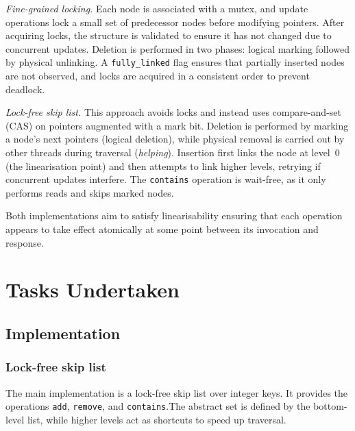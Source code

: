 \documentclass[11pt,a4paper]{article}
\begin{document}
\emph{Fine-grained locking.}
Each node is associated with a mutex, and update operations lock a small set of
predecessor nodes before modifying pointers. After acquiring locks, the
structure is validated to ensure it has not changed due to concurrent updates.
Deletion is performed in two phases: logical marking followed by physical
unlinking. A \texttt{fully\_linked} flag ensures that partially inserted nodes
are not observed, and locks are acquired in a consistent order to prevent
deadlock.

\emph{Lock-free skip list.}
This approach avoids locks and instead uses compare-and-set (CAS) on pointers
augmented with a mark bit. Deletion is performed by marking a node’s next
pointers (logical deletion), while physical removal is carried out by other
threads during traversal (\emph{helping}). Insertion first links the node at
level~0 (the linearisation point) and then attempts to link higher levels,
retrying if concurrent updates interfere. The \texttt{contains} operation is
wait-free, as it only performs reads and skips marked nodes.

Both implementations aim to satisfy linearisability
ensuring that each operation appears to take effect atomically at some point
between its invocation and response.



\section{Tasks Undertaken}
\label{sec:tasks}

\subsection{Implementation}

\subsubsection{Lock-free skip list}
\label{sec:lockfree-impl}

The main implementation is a lock-free skip list over integer keys. It provides the operations \texttt{add}, \texttt{remove}, and \texttt{contains}.The abstract set is defined by the bottom-level list, while higher levels act as shortcuts to speed up traversal.
\end{document}
